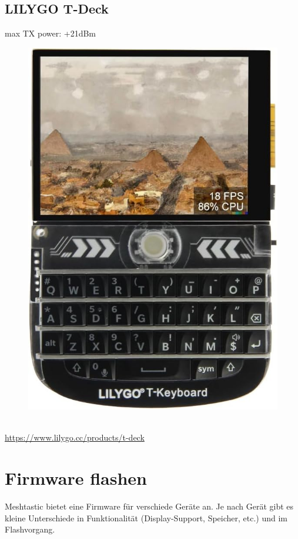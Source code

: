 \documentclass[12pt,a4paper]{article}
\begin{document}
\subsection{LILYGO T-Deck}
max TX power: +21dBm\\
\begin{figure}[h]
	\includegraphics[scale=0.1]{./Bilder/Devices/t-deck.jpg}
\end{figure}\\
\url{https://www.lilygo.cc/products/t-deck}
\newpage
\section{Firmware flashen}

Meshtastic bietet eine Firmware für verschiede Geräte an. Je nach Gerät gibt es kleine Unterschiede
in Funktionalität (Display-Support, Speicher, etc.) und im Flashvorgang.
\end{document}
